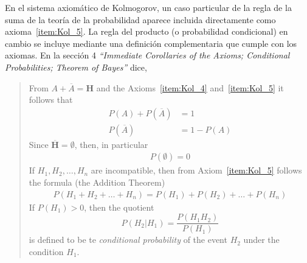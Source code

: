 \documentclass[a4paper,11pt]{book}
\theoremstyle{definition}
\begin{document}
En el sistema axiom\'atico de Kolmogorov, un caso particular de la regla de la suma de la teor\'ia de la probabilidad aparece incluida directamente como axioma~\ref{item:Kol_5}.
%
La regla del producto (o probabilidad condicional) en cambio se incluye mediante una definici\'on complementaria que cumple con los axiomas.
%
En la secci\'on 4 \emph{``Immediate Corollaries of the Axioms; Conditional Probabilities; Theorem of Bayes''} dice,
%
\begin{quotation}
From $A + \overline{A} = \textbf{H}$ and the Axioms~\ref{item:Kol_4} and~\ref{item:Kol_5} it follows that
%
\begin{align}
  P(A) + P(\overline{A}) &= 1 \\
  P(\overline{A}) &= 1-P(A)
\end{align}
%
Since $\overline{\textbf{H}} = \emptyset$, then, in particular
%
\begin{align}
  P(\emptyset) = 0
\end{align}
%
If $H_1, H_2, \dots, H_n$ are incompatible, then from Axiom~\ref{item:Kol_5} follows the formula (the Addition Theorem)
%
\begin{align} \label{eq:sum_rule_kolmogorov}
  P(H_1 + H_2 + \dots + H_n) = P(H_1) + P(H_2) + \dots + P(H_n)
\end{align}
%
If $P(H_1) > 0$, then the quotient
%
\begin{equation} \label{eq:conditional_probability_kolmogorov}
  P(H_2|H_1) = \frac{P(H_1H_2)}{P(H_1)}
\end{equation}
%
is defined to be te \emph{conditional probability} of the event $H_2$ under the condition $H_1$.



\end{quotation}
\end{document}
